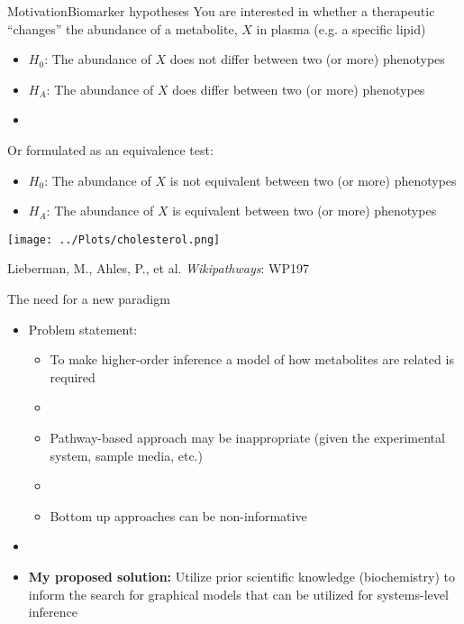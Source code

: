 \documentclass[xcolor=dvipsnames]{beamer}
\begin{document}
\begin{frame}{Motivation}{Biomarker hypotheses}
	\vspace{-10pt}
	You are interested in whether a therapeutic ``changes'' the abundance of a metabolite, $X$ in plasma (e.g. a specific lipid) \pause
	\begin{itemize}
		\item $H_0$: The abundance of $X$ does not differ between two (or more) phenotypes \pause
		\item $H_A$: The abundance of $X$ does differ between two (or more) phenotypes 
		\item[]
	\end{itemize} \pause
	
	Or formulated as an equivalence test:
	\begin{itemize}
		\item $H_0$: The abundance of $X$ is not equivalent between two (or more) phenotypes  
		\item $H_A$: The abundance of $X$ is equivalent between two (or more) phenotypes  
	\end{itemize}
\end{frame}

\begin{frame}
	\begin{center}
			\texttt{[image: ../Plots/cholesterol.png]}
			
			Lieberman, M., Ahles, P., et al. \emph{Wikipathways}: WP197
	\end{center}
\end{frame}

\begin{frame}{The need for a new paradigm}
\vspace{-15.5pt}
\begin{itemize}
	\item Problem statement: \pause
	\begin{itemize}
		\item To make higher-order inference a model of how metabolites are related is required \pause
		\item[]
		\item Pathway-based approach may be inappropriate (given the experimental system, sample media, etc.) \pause
		\item[]
		\item Bottom up approaches can be non-informative \pause

	\end{itemize}
	\item[]
	\item \textbf{My proposed solution:} Utilize prior scientific knowledge (biochemistry) to inform the search for graphical models that can be utilized for systems-level inference
\end{itemize}
\end{frame}
\end{document}
